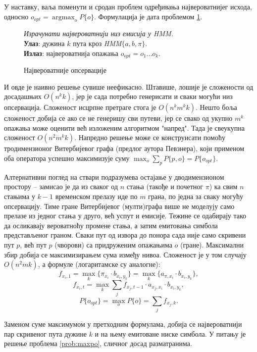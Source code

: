 \documentclass[12pt,oneside]{memoir}
\newenvironment{problem}[1][!ht]
{\renewcommand{\algorithmcfname}{Проблем}
\begin{figure}[!ht]
\centering
  \begin{minipage}{.94\linewidth}
	\begin{algorithm}[#1]%
  }{\end{algorithm}
  \end{minipage}
\end{figure}}
\begin{document}
\begin{CJK}{UTF8}{ipxm}
У наставку, ваља поменути и сродан проблем одређивања највероватнијег исхода, односно $o_{opt} = \operatorname{argmax}_o P\{o\}$. Формулација је дата проблемом \ref{prob:maxops}.

\begin{problem}[H]
  \SetAlgoLined
  \textit{Израчунати највероватнији низ емисија у \textit{HMM}.}\\
  \textbf{Улаз}: дужина $k$ пута кроз \textit{HMM}$\{a, b, \pi\}$.\\
  \textbf{Излаз}: највероватнија опажања $o_{opt} = o_1...o_k$.
  \caption{Највероватније опсервације}
  \label{prob:maxops}
\end{problem}

И овде је наивно решење сувише неефикасно. Штавише, лошије је сложености од досадашњих $O(n^k k)$, јер је сада потребно генерисати и сваки могући низ опсервација. Сложеност исцрпне претраге стога је $O(n^k m^k k)$. Нешто боља сложеност добија се ако се не генеришу сви путеви, јер се свако од укупно $m^k$ опажања може оценити већ изложеним алгоритмом "напред". Тада је свеукупна сложеност $O(n^2 m^k k)$. Напредно решење може се конструисати помоћу тродимензионог Витербијевог графа (предлог аутора Певзнера), који применом оба оператора успешно максимизује суму $\max_o \sum_p P\{p, o\} = P\{o_{opt}\}$.

Алтернативни поглед на ствари подразумева остајање у дводимензионом простору -- замисао је да из сваког од $n$ стања (такође и почетног $\pi$) ка свим $n$ стањима у $k-1$ временском прелазу иде по $m$ грана, по једна за сваку могућу опсервацију. Тиме гране Витербијевог (мулти)графа више не моделују само прелазе из једног стања у друго, већ успут и емисије. Тежине се одабирају тако да осликавају вероватноћу промене стања, а затим емитовања симбола представљеног граном. Сваки пут од извора до понора сада није само скривени пут $p$, већ пут $p$ (чворови) са придруженим опажањима $o$ (гране). Максимални збир добија се максимизирањем сума између нивоа. Сложеност је у том случају $O(n^2 m k)$, а формуле (логаритамске су аналогне): $$f_{x_i, 1} = \max_k \{\pi_{x_i} \cdot b_{x_i, y_k}\} = \max_k \{a_{\pi, x_i} \cdot b_{x_i, y_k}\},$$ $$f_{x_i, t} = \max_k \sum_j f_{x_j, t-1} \cdot a_{x_j, x_i} \cdot b_{x_i, y_k},$$ $$P\{o_{opt}\} = \max_o P\{o\} = \sum_j f_{x_j, k}.$$

Заменом суме максимумом у претходним формулама, добија се највероватнији пар скривеног пута дужине $k$ и на њему емитоване ниске симбола. У питању је решење проблема \ref{prob:maxpo}, сличног досад разматранима.


\end{CJK}
\end{document}
